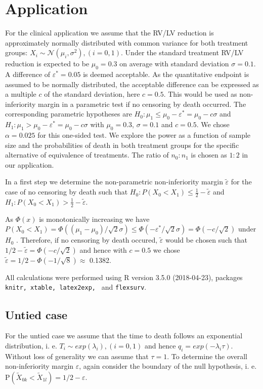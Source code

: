 \documentclass[bimj,fleqn]{w-art}\usepackage[]{graphicx}\usepackage[]{color}
\theoremstyle{plain}
\theoremstyle{definition}
\begin{document}
\section{Application}
\label{sec:Application}
For the clinical application we assume that the RV/LV reduction is approximately normally distributed
with common variance for both treatment groups:
$X_i \sim \mathcal{N} ( \mu_i, \sigma^2 ), (i = 0, 1)$. Under the standard
treatment RV/LV reduction is expected to be $\mu_0 = 0.3$ on average with
standard deviation $\sigma= 0.1$. A difference of $\varepsilon^{*} = 0.05$ is
deemed acceptable. As the quantitative endpoint is assumed to be normally distributed,
the acceptable difference can be expressed as a multiple $c$
of the standard deviation, here $c = 0.5$. This would be used as
non-inferiority margin in a parametric test if no censoring by death occurred.
The corresponding parametric hypotheses are $H_0:
\mu_1 \leq \mu_0 - \varepsilon^{*}  = \mu_0 - c \sigma $ and
$H_1: \mu_1 > \mu_0 - \varepsilon^{*} = \mu_0 - c \sigma $ with $\mu_0 = 0.3$,
$\sigma = 0.1$ and $c = 0.5$. We chose $\alpha = 0.025$ for this one-sided test.
We explore the power as a function of sample size and the probabilities of death in
both treatment groups for the specific alternative of equivalence of treatments.
The ratio of $n_0 : n_1$ is chosen as $1 : 2 $ in our application.

In a first step we determine the non-parametric non-inferiority margin $\tilde{\varepsilon}$
for the case of no censoring by death such that
$H_0: P(X_0 < X_1) \leq \frac{1}{2} - \tilde{\varepsilon}$ and
$H_1: P(X_0 < X_1) >  \frac{1}{2} - \tilde{\varepsilon}$.

As $\Phi(x)$ is monotonically increasing we have
$P(X_0 < X_1) = \Phi((\mu_1 - \mu_0)/\sqrt{2}\sigma) \leq
\Phi(- \varepsilon^{*}/ \sqrt{2}\sigma) = \Phi(-c/\sqrt{2}) $ under $H_0$ .
Therefore, if no censoring by death occured, $\tilde{\varepsilon}$ would be chosen
such that $1/2 - \tilde{\varepsilon} = \Phi(- c/\sqrt{2}) $ and hence with
$c = 0.5$ we chose  $\tilde{\varepsilon} = 1/2 - \Phi(- 1/\sqrt{8})
\approx $ 0.1382.

All calculations were performed using R version 3.5.0 (2018-04-23),
packages {\tt{knitr, xtable, latex2exp, }} and {\tt{flexsurv}}.

\subsection{Untied case}
\label{sec:AppUntied}
For the untied case we assume that the time to death follows an exponential distribution, i. e.
$T_i \sim exp(\lambda_i), (i=0,1)$ and hence $q_i = exp(-\lambda_i \tau)$. Without
loss of generality we can assume that $\tau = 1$. To determine the overall
non-inferiority margin $\varepsilon$, again consider the boundary of the null hypothesis,
i. e. $\text{P}(\widetilde{X}_{0k} < \widetilde{X}_{1l}) = 1/2 - \varepsilon $.
\end{document}

